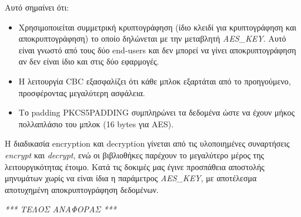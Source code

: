 \documentclass{article}
\begin{document}
Αυτό σημαίνει ότι:
\begin{itemize}
    \item Χρησιμοποιείται συμμετρική κρυπτογράφηση (ίδιο κλειδί για κρυπτογράφηση και αποκρυπτογράφηση) το οποίο δηλώνεται με την μεταβλητή
    \textit{AES\_KEY}. Αυτό είναι γνωστό από τους δύο end-users και δεν μπορεί να γίνει αποκρυπτογράφηση αν δεν είναι ίδιο και στις δύο εφαρμογές.
    \item Η λειτουργία CBC εξασφαλίζει ότι κάθε μπλοκ εξαρτάται από το προηγούμενο, προσφέροντας μεγαλύτερη ασφάλεια.
    \item Το padding PKCS5PADDING συμπληρώνει τα δεδομένα ώστε να έχουν μήκος πολλαπλάσιο του μπλοκ (16 bytes για AES). 
\end{itemize}

Η διαδικασία encryption και decryption γίνεται από τις υλοποιημένες συναρτήσεις \textit{encrypt} και \textit{decrypt}, ενώ οι βιβλιοθήκες παρέχουν
το μεγαλύτερο μέρος της λειτουργικότητας έτοιμο. Κατά τις δοκιμές μας έγινε προσπάθεια αποστολής μηνυμάτων χωρίς να είναι ίδια η παράμετρος
\textit{AES\_KEY}, με αποτέλεσμα αποτυχημένη αποκρυπτογράφηση δεδομένων. 

\newpage
\centering
\emph{*** ΤΕΛΟΣ ΑΝΑΦΟΡΑΣ ***}
\end{document}
